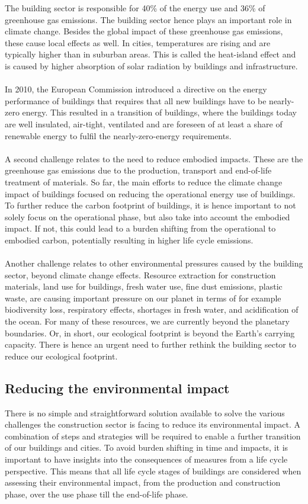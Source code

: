 \documentclass[../summary.tex]{subfiles}
\begin{document}
	The building sector is responsible for 40\% of the energy use and 36\% of greenhouse gas emissions. The building sector hence plays an important role in climate change. Besides the global impact of these greenhouse gas emissions, these cause local effects as well. In cities, temperatures are rising and are typically higher than in suburban areas. This is called the heat-island effect and is caused by higher absorption of solar radiation by buildings and infrastructure.
	\\\\
	In 2010, the European Commission introduced a directive on the energy performance of buildings that requires that all new buildings have to be nearly-zero energy. This resulted in a transition of buildings, where the buildings today are well insulated, air-tight, ventilated and are foreseen of at least a share of renewable energy to fulfil the nearly-zero-energy requirements.
	\\\\
	A second challenge relates to the need to reduce embodied impacts. These are the greenhouse gas emissions due to the production, transport and end-of-life treatment of materials. So far, the main efforts to reduce the climate change impact of buildings focused on reducing the operational energy use of buildings. To further reduce the carbon footprint of buildings, it is hence important to not solely focus on the operational phase, but also take into account the embodied impact. If not, this could lead to a burden shifting from the operational to embodied carbon, potentially resulting in higher life cycle emissions.
	\\\\
	Another challenge relates to other environmental pressures caused by the building sector, beyond climate change effects. Resource extraction for construction materials, land use for buildings, fresh water use, fine dust emissions, plastic waste, are causing important pressure on our planet in terms of for example biodiversity loss, respiratory effects, shortages in fresh water, and acidification of the ocean. For many of these resources, we are currently beyond the planetary boundaries. Or, in short, our ecological footprint is beyond the Earth’s carrying capacity. There is hence an urgent need to further rethink the building sector to reduce our ecological footprint. 
	
	\subsection{Reducing the environmental impact}
	
	There is no simple and straightforward solution available to solve the various challenges the construction sector is facing to reduce its environmental impact. A combination of steps and strategies will be required to enable a further transition of our buildings and cities. To avoid burden shifting in time and impacts, it is important to have insights into the consequences of measures from a life cycle perspective. This means that all life cycle stages of buildings are considered when assessing their environmental impact, from the production and construction phase, over the use phase till the end-of-life phase. 
	
\end{document}
